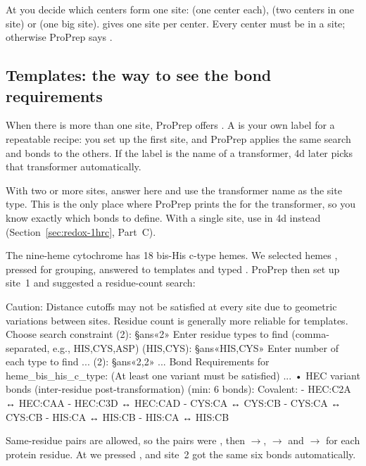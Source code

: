 At  you decide which centers form one site:
 (one center each),  (two centers in one site) or
 (one big site).  gives one site per center. Every
center must be in a site; otherwise ProPrep says
.

\subsection{Templates: the way to see the bond requirements}
\label{sec:redox-templates}

When there is more than one site, ProPrep offers
.
A  is your own label for a repeatable recipe: you set up the
first site, and ProPrep applies the same search and bonds to the others. If
the label is the name of a transformer, 4d later picks that transformer
automatically.

\begin{tip}
With two or more sites, answer  here and use the transformer name as
the site type. This is the only place where ProPrep prints the
 for the transformer, so you know exactly which bonds
to define. With a single site, use  in 4d instead
(Section~\ref{sec:redox-1hrc}, Part~C).
\end{tip}

\begin{example}
The nine-heme cytochrome  has 18 bis-His c-type hemes. We selected
hemes , pressed  for grouping, answered  to
templates and typed . ProPrep then set up
site~1 and suggested a residue-count search:
\begin{screen}
Caution: Distance cutoffs may not be satisfied at every site due to geometric
variations between sites. Residue count is generally more reliable for templates.
Choose search constraint (2): §ans«2»
Enter residue types to find (comma-separated, e.g., HIS,CYS,ASP) (HIS,CYS): §ans«HIS,CYS»
Enter number of each type to find ... (2): §ans«2,2»
...
Bond Requirements for heme_bis_his_c_type:
(At least one variant must be satisfied)
...
• HEC variant bonds (inter-residue post-transformation) (min: 6 bonds):
  Covalent:
    - HEC:C2A ↔ HEC:CAA
    - HEC:C3D ↔ HEC:CAD
    - CYS:CA ↔ CYS:CB
    - CYS:CA ↔ CYS:CB
    - HIS:CA ↔ HIS:CB
    - HIS:CA ↔ HIS:CB
\end{screen}
Same-residue pairs are allowed, so the pairs were
, then $\to$,
$\to$ and $\to$ for each protein
residue. At  we pressed , and site~2 got the same six
bonds automatically.
\end{example}

